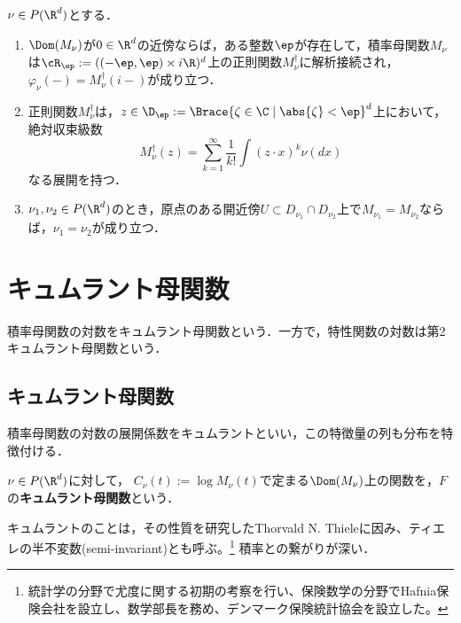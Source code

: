 \documentclass[uplatex,dvipdfmx]{jsreport}
\begin{document}
\begin{theorem}[特性関数との関係と一意性定理]
    $\nu\in P(\R^d)$とする．
    \begin{enumerate}
        \item $\Dom(M_\nu)$が$0\in\R^d$の近傍ならば，ある整数$\ep$が存在して，積率母関数$M_\nu$は$\cR_\ep:=((-\ep,\ep)\times i\R)^d$上の正則関数$M^\dagger_\nu$に解析接続され，$\varphi_\nu(-)=M^\dagger_\nu(i-)$が成り立つ．
        \item 正則関数$M^\dagger_\nu$は，$z\in\D_\ep:=\Brace{\zeta\in\C\mid\abs{\zeta}<\ep}^d$上において，絶対収束級数
        \[M^\dagger_\nu(z)=\sum^\infty_{k=1}\frac{1}{k!}\int(z\cdot x)^k\nu(dx)\]
        なる展開を持つ．
        \item $\nu_1,\nu_2\in P(\R^d)$のとき，原点のある開近傍$U\subset D_{\nu_1}\cap D_{\nu_2}$上で$M_{\nu_1}=M_{\nu_2}$ならば，$\nu_1=\nu_2$が成り立つ．
    \end{enumerate}
\end{theorem}

\section{キュムラント母関数}

\begin{tcolorbox}[colframe=ForestGreen, colback=ForestGreen!10!white,breakable,colbacktitle=ForestGreen!40!white,coltitle=black,fonttitle=\bfseries\sffamily,
title=]
    積率母関数の対数をキュムラント母関数という．一方で，特性関数の対数は第2キュムラント母関数という．
\end{tcolorbox}

\subsection{キュムラント母関数}

\begin{tcolorbox}[colframe=ForestGreen, colback=ForestGreen!10!white,breakable,colbacktitle=ForestGreen!40!white,coltitle=black,fonttitle=\bfseries\sffamily,
title=]
    積率母関数の対数の展開係数をキュムラントといい，この特徴量の列も分布を特徴付ける．
\end{tcolorbox}

\begin{definition}
    $\nu\in P(\R^d)$に対して，
    $C_\nu(t):=\log M_\nu(t)$で定まる$\Dom(M_\nu)$上の関数を，$F$の\textbf{キュムラント母関数}という．
\end{definition}
\begin{history}
    キュムラントのことは，その性質を研究したThorvald N. Thieleに因み、ティエレの半不変数(semi-invariant)とも呼ぶ。\footnote{統計学の分野で尤度に関する初期の考察を行い、保険数学の分野でHafnia保険会社を設立し、数学部長を務め、デンマーク保険統計協会を設立した。}
    積率との繋がりが深い．
\end{history}
\end{document}
